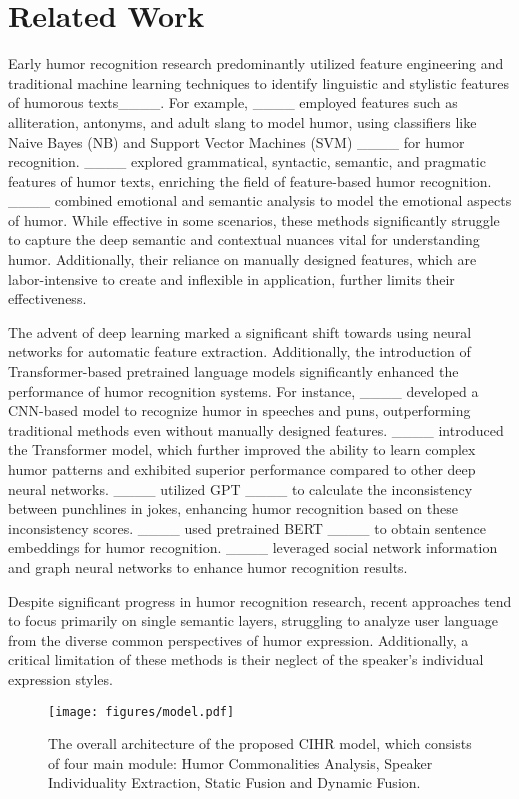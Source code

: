 \section{Related Work}
Early humor recognition research predominantly utilized feature engineering and traditional machine learning techniques to identify linguistic and stylistic features of humorous texts____.
For example, ____ employed features such as alliteration, antonyms, and adult slang to model humor, using classifiers like Naive Bayes (NB) and Support Vector Machines (SVM) ____ for humor recognition. ____ explored grammatical, syntactic, semantic, and pragmatic features of humor texts, enriching the field of feature-based humor recognition. ____ combined emotional and semantic analysis to model the emotional aspects of humor. 
While effective in some scenarios, these methods significantly struggle to capture the deep semantic and contextual nuances vital for understanding humor. 
Additionally, their reliance on manually designed features, which are labor-intensive to create and inflexible in application, further limits their effectiveness.

The advent of deep learning marked a significant shift towards using neural networks for automatic feature extraction. 
Additionally, the introduction of Transformer-based pretrained language models significantly enhanced the performance of humor recognition systems. 
For instance, ____ developed a CNN-based model to recognize humor in speeches and puns, outperforming traditional methods even without manually designed features. 
____ introduced the Transformer model, which further improved the ability to learn complex humor patterns and exhibited superior performance compared to other deep neural networks. 
____ utilized GPT ____ to calculate the inconsistency between punchlines in jokes, enhancing humor recognition based on these inconsistency scores. 
____ used pretrained BERT ____ to obtain sentence embeddings for humor recognition. 
____ leveraged social network information and graph neural networks to enhance humor recognition results.

Despite significant progress in humor recognition research, recent approaches tend to focus primarily on single semantic layers, struggling to analyze user language from the diverse common perspectives of humor expression. Additionally, a critical limitation of these methods is their neglect of the speaker’s individual expression styles. 

\begin{figure*}[!ht]
\centering
    \texttt{[image: figures/model.pdf]}
\caption{The overall architecture of the proposed CIHR model, which consists of four main module: Humor Commonalities Analysis, Speaker Individuality Extraction, Static Fusion and Dynamic Fusion.}
\label{fig:model}
\end{figure*}